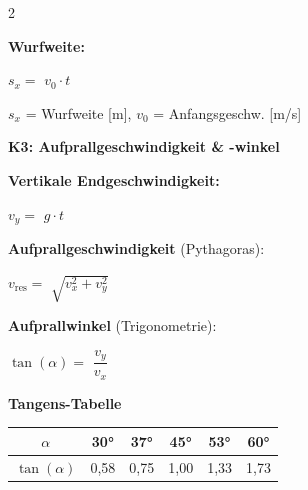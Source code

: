 \documentclass[10pt, a4paper]{article}
\newcommand{\fachfarbe}{physik}
\newcommand{\lsg}[1]{\textcolor{loesung}{\textbf{#1}}}
\newcommand{\abschnitt}[1]{%
    \vspace{4pt}
    \noindent\textbf{\textcolor{\fachfarbe}{#1}}
    \vspace{2pt}
}
\begin{document}
\begin{multicols}{2}
\vspace{3pt}

\begin{formelbox}
\textbf{Wurfweite:}
\vspace{4pt}

$s_x = $ \lsg{$v_0 \cdot t$}

\vspace{2pt}
\footnotesize
$s_x$ = Wurfweite [m], $v_0$ = Anfangsgeschw. [m/s]
\end{formelbox}

\vspace{2pt}


\abschnitt{K3: Aufprallgeschwindigkeit \& -winkel}

\begin{formelbox}
\textbf{Vertikale Endgeschwindigkeit:}
\vspace{4pt}

$v_y = $ \lsg{$g \cdot t$}

\vspace{6pt}
\textbf{Aufprallgeschwindigkeit} (Pythagoras):
\vspace{4pt}

$v_{\text{res}} = $ \lsg{$\sqrt{v_x^2 + v_y^2}$}

\vspace{6pt}
\textbf{Aufprallwinkel} (Trigonometrie):
\vspace{4pt}

$\tan(\alpha) = $ \lsg{$\dfrac{v_y}{v_x}$}
\end{formelbox}

\vspace{2pt}


\abschnitt{Tangens-Tabelle}

\begin{center}
\begin{tabular}{|c|c|c|c|c|c|}
\hline
$\alpha$ & 30° & 37° & 45° & 53° & 60° \\
\hline
$\tan(\alpha)$ & 0,58 & 0,75 & 1,00 & 1,33 & 1,73 \\
\hline
\end{tabular}
\end{center}


\end{multicols}
\end{document}
